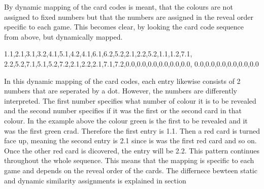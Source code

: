 By dynamic mapping of the card codes is meant, that the colours are not assigned to fixed numbers but that the numbers are assigned in the reveal order specific to each game. This becomes clear, by looking the card code sequence from above, but dynamically mapped.
\begin{verbatim*}
1.1,2.1,3.1,3.2,4.1,5.1,4.2,4.1,6.1,6.2,5.2,2.1,2.2,5.2,1.1,1.2,7.1,
2.2,5.2,7.1,5.1,5.2,7.2,2.1,2.2,2.1,7.1,7.2,0.0,0.0,0.0,0.0,0.0,0.0,
0.0,0.0,0.0,0.0,0.0,0.0
\end{verbatim*}

 In this dynamic mapping of the card codes, each entry likewise consists of 2 numbers that are seperated by a dot. However, the numbers are differently interpreted. The first number specifies what number of colour it is to be revealed and the second number specifies if it was the first or the second card in that colour. In the example above the colour green is the first to be revealed and it was the first green crad. Therefore the first entry is 1.1. Then a red card is turned face up, meaning the second entry is 2.1 since is was the first red card and so on. Once the other red card is dicovered, the entry will be 2.2. This pattern continues throughout the whole sequence. This means that the mapping is specific to each game and depends on the reveal order of the cards. The differnece bewteen static and dynamic similarity assignments is explained in section 


